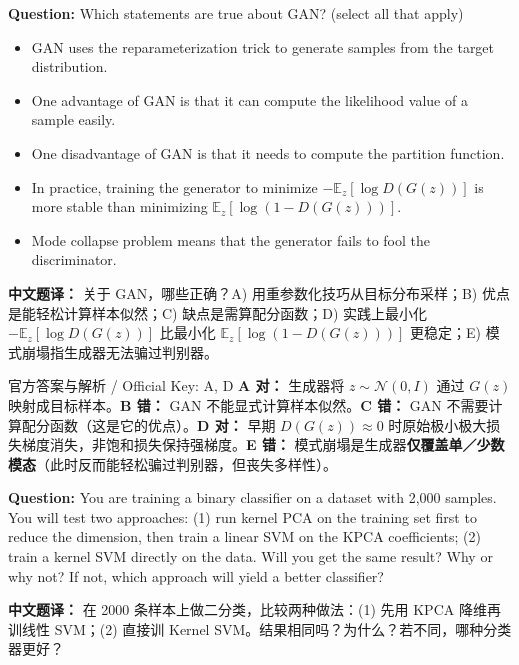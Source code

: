 \textbf{Question:} Which statements are true about GAN? (select all that apply)
\begin{itemize}
\item[A)] GAN uses the reparameterization trick to generate samples from the target distribution.
\item[B)] One advantage of GAN is that it can compute the likelihood value of a sample easily.
\item[C)] One disadvantage of GAN is that it needs to compute the partition function.
\item[D)] In practice, training the generator to minimize $-\mathbb{E}_z[\log D(G(z))]$ is more stable than minimizing $\mathbb{E}_z[\log(1-D(G(z)))]$.
\item[E)] Mode collapse problem means that the generator fails to fool the discriminator.
\end{itemize}
\textbf{中文题译：} 关于 GAN，哪些正确？A) 用重参数化技巧从目标分布采样；B) 优点是能轻松计算样本似然；C) 缺点是需算配分函数；D) 实践上最小化 $-\mathbb{E}_z[\log D(G(z))]$ 比最小化 $\mathbb{E}_z[\log(1-D(G(z)))]$ 更稳定；E) 模式崩塌指生成器无法骗过判别器。

\begin{StudySolution}{官方答案与解析 / Official Key: A, D}
\textbf{A 对：} 生成器将 $z\sim\mathcal{N}(0,I)$ 通过 $G(z)$ 映射成目标样本。\textbf{B 错：} GAN 不能显式计算样本似然。\textbf{C 错：} GAN 不需要计算配分函数（这是它的优点）。\textbf{D 对：} 早期 $D(G(z))\approx 0$ 时原始极小极大损失梯度消失，非饱和损失保持强梯度。\textbf{E 错：} 模式崩塌是生成器\textbf{仅覆盖单／少数模态}（此时反而能轻松骗过判别器，但丧失多样性）。
\end{StudySolution}


\textbf{Question:} You are training a binary classifier on a dataset with 2,000 samples. You will test two approaches: (1) run kernel PCA on the training set first to reduce the dimension, then train a linear SVM on the KPCA coefficients; (2) train a kernel SVM directly on the data. Will you get the same result? Why or why not? If not, which approach will yield a better classifier?

\textbf{中文题译：} 在 2000 条样本上做二分类，比较两种做法：(1) 先用 KPCA 降维再训线性 SVM；(2) 直接训 Kernel SVM。结果相同吗？为什么？若不同，哪种分类器更好？


